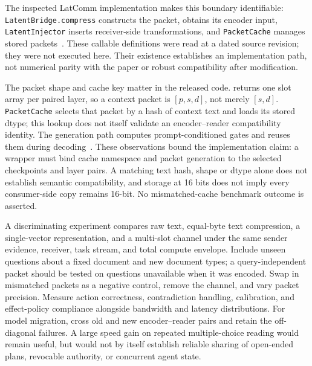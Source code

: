 The inspected LatComm implementation makes this boundary identifiable: \texttt{LatentBridge.compress} constructs the packet,  obtains its encoder input, \texttt{LatentInjector} inserts receiver-side transformations, and \texttt{PacketCache} manages stored packets~\cite{lin2026latcomm}. These callable definitions were read at a dated source revision; they were not executed here. Their existence establishes an implementation path, not numerical parity with the paper or robust compatibility after modification.

The packet shape and cache key matter in the released code.  returns one slot array per paired layer, so a context packet is $[p,s,d]$, not merely $[s,d]$. \texttt{PacketCache} selects that packet by a hash of context text and loads its stored dtype; this lookup does not itself validate an encoder--reader compatibility identity. The generation path computes prompt-conditioned gates and reuses them during decoding~\cite{cumb2026latcommcode}. These observations bound the implementation claim: a wrapper must bind cache namespace and packet generation to the selected checkpoints and layer pairs. A matching text hash, shape or dtype alone does not establish semantic compatibility, and storage at 16 bits does not imply every consumer-side copy remains 16-bit. No mismatched-cache benchmark outcome is asserted.

A discriminating experiment compares raw text, equal-byte text compression, a single-vector representation, and a multi-slot channel under the same sender evidence, receiver, task stream, and total compute envelope. Include unseen questions about a fixed document and new document types; a query-independent packet should be tested on questions unavailable when it was encoded. Swap in mismatched packets as a negative control, remove the channel, and vary packet precision. Measure action correctness, contradiction handling, calibration, and effect-policy compliance alongside bandwidth and latency distributions. For model migration, cross old and new encoder--reader pairs and retain the off-diagonal failures. A large speed gain on repeated multiple-choice reading would remain useful, but would not by itself establish reliable sharing of open-ended plans, revocable authority, or concurrent agent state.


